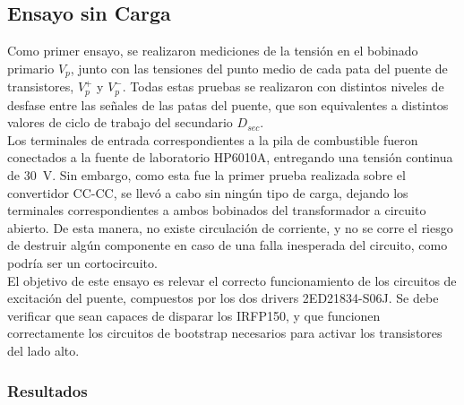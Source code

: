 \subsection{Ensayo sin Carga}

Como primer ensayo, se realizaron mediciones de la tensión en el bobinado primario $V_p$, junto con las tensiones del punto medio de cada pata del puente de transistores, $V_p^+$ y $V_p^-$. Todas estas pruebas se realizaron con distintos niveles de desfase entre las señales de las patas del puente, que son equivalentes a distintos valores de ciclo de trabajo del secundario $D_{sec}$.\\

Los terminales de entrada correspondientes a la pila de combustible fueron conectados a la fuente de laboratorio HP6010A, entregando una tensión continua de \SI{30}{\volt}. Sin embargo, como esta fue la primer prueba realizada sobre el convertidor CC-CC, se llevó a cabo sin ningún tipo de carga, dejando los terminales correspondientes a ambos bobinados del transformador a circuito abierto. De esta manera, no existe circulación de corriente, y no se corre el riesgo de destruir algún componente en caso de una falla inesperada del circuito, como podría ser un cortocircuito.\\

El objetivo de este ensayo es relevar el correcto funcionamiento de los circuitos de excitación del puente, compuestos por los dos drivers 2ED21834-S06J. Se debe verificar que sean capaces de disparar los IRFP150, y que funcionen correctamente los circuitos de bootstrap necesarios para activar los transistores del lado alto.\\

\subsubsection{Resultados}

